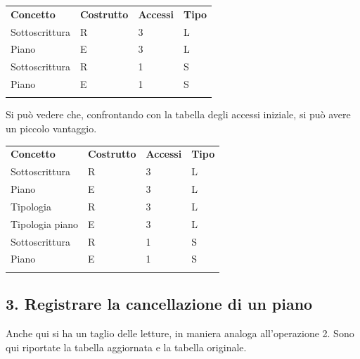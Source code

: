 \documentclass[a4paper,12pt]{report}
\begin{document}
\begin{table}[!htb]
\begin{center}
	\begin{tabular}{ | m{4cm} P{4cm} P{4cm} P{4cm} | }
	 \textbf{Concetto} & \textbf{Costrutto} & \textbf{Accessi} & \textbf{Tipo} \\
	Sottoscrittura  & R & 3 & L \\ \hline
	Piano           & E & 3 & L \\ \hline
	Sottoscrittura  & R & 1 & S \\ \hline
	Piano           & E & 1 & S \\ \hline
	  \\ \hline
	\end{tabular}
\end{center}
\end{table}

Si può vedere che, confrontando con la tabella degli accessi iniziale, si può avere un piccolo vantaggio.

\begin{table}[!htb]
\begin{center}
	\begin{tabular}{ | m{4cm} P{4cm} P{4cm} P{4cm} | }
	 \textbf{Concetto} & \textbf{Costrutto} & \textbf{Accessi} & \textbf{Tipo} \\
	Sottoscrittura  & R & 3 & L \\ \hline
	Piano           & E & 3 & L \\ \hline
	Tipologia       & R & 3 & L \\ \hline
	Tipologia piano & E & 3 & L \\ \hline
	Sottoscrittura  & R & 1 & S \\ \hline
	Piano           & E & 1 & S \\ \hline
	  \\ \hline
	\end{tabular}
\end{center}
\end{table}

\subsection*{3. Registrare la cancellazione di un piano}

Anche qui si ha un taglio delle letture, in maniera analoga all'operazione 2. Sono qui riportate la tabella aggiornata e la tabella originale.
\end{document}
